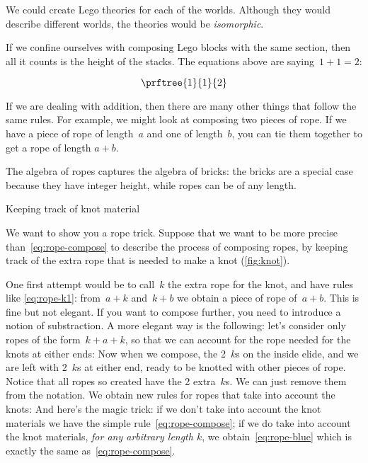 We could create Lego theories for each of the worlds. Although they would describe different worlds, the theories would be \emph{isomorphic}.

If we confine ourselves with composing Lego blocks with the same section, then all it counts is the height of the stacks.
The equations above are saying~$1+1=2$:

\begin{equation}
    \prftree{1}{1}{2}
\end{equation}

If we are dealing with addition, then there are many other things that follow the same rules.
For example, we might look at composing two pieces of rope. If we have a piece of rope of length~$a$ and one of length~$b$, you can tie them together to get a rope of length $a+b$.


The algebra of ropes captures the algebra of bricks: the bricks are a special case because they have integer height, while ropes can be of any length.
\begin{marginfigure}
    \caption{Keeping track of knot material}
    \label{fig:knot}
\end{marginfigure}


We want to show you a rope trick.
Suppose that we want to be more precise than~\cref{eq:rope-compose} to describe the process of composing ropes, by keeping track of the extra rope that is needed to make a knot (\cref{fig:knot}).


One first attempt would be to call~$k$ the extra rope for the knot, and have rules like \cref{eq:rope-k1}: from~$a + k$ and~$k + b$ we obtain a piece of rope of~$a+b$.
%
%
%
This is fine but not elegant.
If you want to compose further, you need to introduce a notion of substraction.
%
%
A more elegant way is the following: let's consider only ropes of the form~$k + a + k$, so that we can account for the rope needed for the knots at either ends:
%
%
Now when we compose, the 2~$k$s on the inside elide, and we are left with 2~$k$s at either end, ready to be knotted with other pieces of rope.
Notice that all ropes so created have the 2 extra~$k$s.
We can just remove them from the notation. We obtain new rules for ropes that take into account the knots:
%
%
And here's the magic trick: if we don't take into account the knot materials we have the simple rule~\cref{eq:rope-compose}; if we do take into account the knot materials, \emph{for any arbitrary length $k$}, we obtain~\cref{eq:rope-blue} which is exactly the same as~\cref{eq:rope-compose}.

